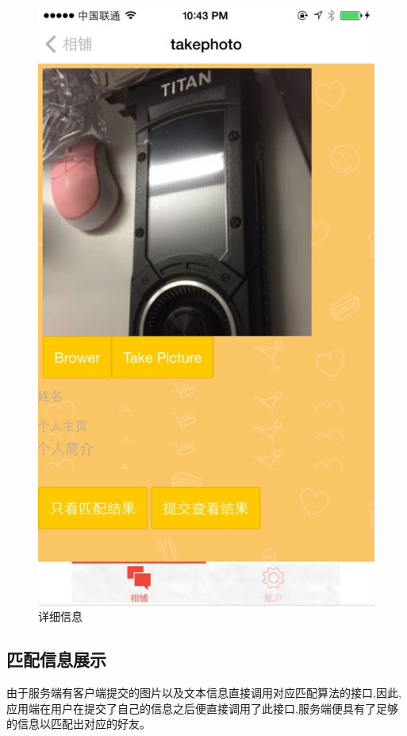 \begin{figure}[h]
\begin{minipage}[t]{0.45\linewidth}
\includegraphics[width=\textwidth]{img/chap4/take2.jpg}
\caption{详细信息\label{instagram}}
\end{minipage}


\end{figure}
\subsection{匹配信息展⽰}
由于服务端有客户端提交的图片以及文本信息直接调用对应匹配算法的接口,因此,应用端在用户在提交了自己的信息之后便直接调用了此接口,服务端便具有了足够的信息以匹配出对应的好友。

